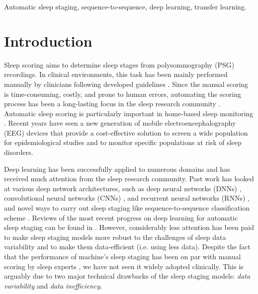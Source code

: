 \documentclass[journal,twoside,web]{ieeecolor}
\begin{document}
\begin{IEEEkeywords}
Automatic sleep staging, sequence-to-sequence, deep learning, transfer learning. 
\end{IEEEkeywords}

\section{Introduction}
\label{sec:introduction}

Sleep scoring \cite{Iber2007,Hobson1969} aims to determine  sleep stages from polysommography (PSG) recordings. In clinical environments, this task has been mainly performed manually by clinicians following developed guidelines \cite{Iber2007,Hobson1969}. Since the manual scoring is time-consuming, costly, and prone to human errors, automating the scoring process has been a long-lasting focus in the sleep research community \cite{Redmond2006,Phan2019a,Phan2019b,Supratak2017,Tsinalis2016, Stephansen2018,Mikkelsen2018,Chambon2018}. Automatic sleep scoring is particularly important in home-based sleep monitoring \cite{Mikkelsen2019,Looney2016,Goverdovsky2016,Kidmose2013}. Recent years have seen a new generation of mobile electroencephalography (EEG) devices that provide a cost-effective solution to screen a wide population for epidemiological studies and to monitor specific populations at risk of sleep disorders.

Deep learning has been successfully applied to numerous domains and has received much attention from the sleep research community. Past work has looked at various deep network architectures, such as deep neural networks (DNNs) \cite{Dong2017}, convolutional neural networks (CNNs) \cite{Tsinalis2016, Andreotti2018b, phan2018c, Chambon2018, Vilamala2017, Sors2018, Stephansen2018, Patanaik2018, Biswal2018a, Biswal2017, Sun2017, Olesen2018}, and recurrent neural networks (RNNs) \cite{phan2018d,Koch2018a,Koch2018b, Zhai2020}, and novel ways to carry out sleep staging like sequence-to-sequence classification scheme \cite{Phan2019a, Supratak2017}. Reviews of the most recent progress on deep learning for automatic sleep staging can be found in \cite{Faust2019, Roy2019, Fiorillo2019}. However, considerably less attention has been paid to make sleep staging models more robust to the challenges of sleep data variability and to make them data-efficient (i.e. using less data). Despite the fact that the performance of machine's sleep staging has been on par with manual scoring by sleep experts \cite{Phan2019a, Stephansen2018, Supratak2017, Patanaik2018, Biswal2018a, Biswal2017, Sun2017}, we have not seen it widely adopted clinically. This is arguably due to two major technical drawbacks of the sleep staging models: \emph{data variability} and \emph{data inefficiency}.
\end{document}
